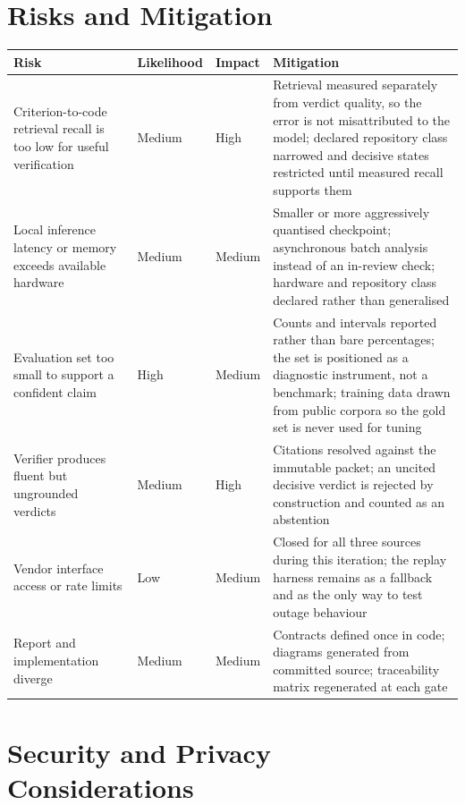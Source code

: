 \section{Risks and Mitigation}

\begin{longtable}{>{\raggedright\arraybackslash}p{}>{\raggedright\arraybackslash}p{}>{\raggedright\arraybackslash}p{}>{\raggedright\arraybackslash}p{}}
\toprule
Risk & Likelihood & Impact & Mitigation \\
\midrule
\endhead
Criterion-to-code retrieval recall is too low for useful verification
  & Medium & High & Retrieval measured separately from verdict quality, so the
    error is not misattributed to the model; declared repository class narrowed
    and decisive states restricted until measured recall supports them \\
Local inference latency or memory exceeds available hardware
  & Medium & Medium & Smaller or more aggressively quantised checkpoint;
    asynchronous batch analysis instead of an in-review check; hardware and
    repository class declared rather than generalised \\
Evaluation set too small to support a confident claim
  & High & Medium & Counts and intervals reported rather than bare
    percentages; the set is positioned as a diagnostic instrument, not a
    benchmark; training data drawn from public corpora so the gold set is never
    used for tuning \\
Verifier produces fluent but ungrounded verdicts
  & Medium & High & Citations resolved against the immutable packet; an
    uncited decisive verdict is rejected by construction and counted as an
    abstention \\
Vendor interface access or rate limits
  & Low & Medium & Closed for all three sources during this iteration; the
    replay harness remains as a fallback and as the only way to test outage
    behaviour \\
Report and implementation diverge
  & Medium & Medium & Contracts defined once in code; diagrams generated from
    committed source; traceability matrix regenerated at each gate \\
\bottomrule
\end{longtable}

\section{Security and Privacy Considerations}
\label{sec:ch9-security}

